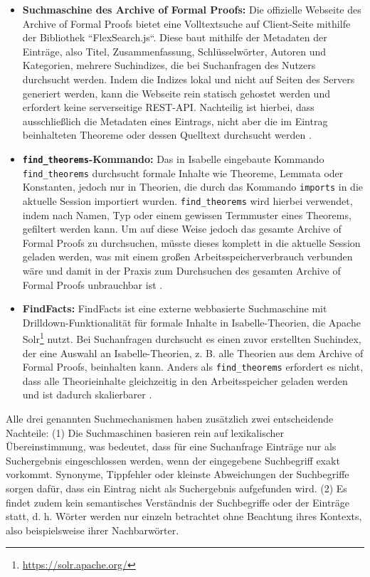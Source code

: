 \documentclass[12pt,letterpaper]{article} %
\begin{document}
\begin{itemize}
  \item \textbf{Suchmaschine des Archive of Formal Proofs:} Die offizielle Webseite des Archive of Formal Proofs bietet eine Volltextsuche auf Client-Seite mithilfe der Bibliothek ``FlexSearch.js``. Diese baut mithilfe der Metadaten der Einträge, also Titel, Zusammenfassung, Schlüsselwörter, Autoren und Kategorien, mehrere Suchindizes, die bei Suchanfragen des Nutzers durchsucht werden. Indem die Indizes lokal und nicht auf Seiten des Servers generiert werden, kann die Webseite rein statisch gehostet werden und erfordert keine serverseitige REST-API. Nachteilig ist hierbei, dass ausschließlich die Metadaten eines Eintrags, nicht aber die im Eintrag beinhalteten Theoreme oder dessen Quelltext durchsucht werden \citep[S. 3-5]{mackenzie_re-imagining_2022}.

  \item \textbf{\texttt{find\_theorems}-Kommando:} Das in Isabelle eingebaute Kommando \texttt{find\_theorems} durchsucht formale Inhalte wie Theoreme, Lemmata oder Konstanten, jedoch nur in Theorien, die durch das Kommando \texttt{imports} in die aktuelle Session importiert wurden. \texttt{find\_theorems} wird hierbei verwendet, indem nach Namen, Typ oder einem gewissen Termmuster eines Theorems, gefiltert werden kann. Um auf diese Weise jedoch das gesamte Archive of Formal Proofs zu durchsuchen, müsste dieses komplett in die aktuelle Session geladen werden, was mit einem großen Arbeitsspeicherverbrauch verbunden wäre und damit in der Praxis zum Durchsuchen des gesamten Archive of Formal Proofs unbrauchbar ist \citep[S. 68]{wenzel_isabelleisar_nodate}.

  \item \textbf{FindFacts:} FindFacts ist eine externe webbasierte Suchmaschine mit Drilldown-Funktionalität für formale Inhalte in Isabelle-Theorien, die Apache Solr\footnote{\url{https://solr.apache.org/}} nutzt. Bei Suchanfragen durchsucht es einen zuvor erstellten Suchindex, der eine Auswahl an Isabelle-Theorien, z. B. alle Theorien aus dem Archive of Formal Proofs, beinhalten kann. Anders als \texttt{find\_theorems} erfordert es nicht, dass alle Theorieinhalte gleichzeitig in den Arbeitsspeicher geladen werden und ist dadurch skalierbarer \citep{huch_findfacts_2022}.
\end{itemize}

Alle drei genannten Suchmechanismen haben zusätzlich zwei entscheidende Nachteile: (1) Die Suchmaschinen basieren rein auf lexikalischer Übereinstimmung, was bedeutet, dass für eine Suchanfrage Einträge nur als Suchergebnis eingeschlossen werden, wenn der eingegebene Suchbegriff exakt vorkommt. Synonyme, Tippfehler oder kleinste Abweichungen der Suchbegriffe sorgen dafür, dass ein Eintrag nicht als Suchergebnis aufgefunden wird. (2) Es findet zudem kein semantisches Verständnis der Suchbegriffe oder der Einträge statt, d. h. Wörter werden nur einzeln betrachtet ohne Beachtung ihres Kontexts, also beispielsweise ihrer Nachbarwörter. %
\end{document}
